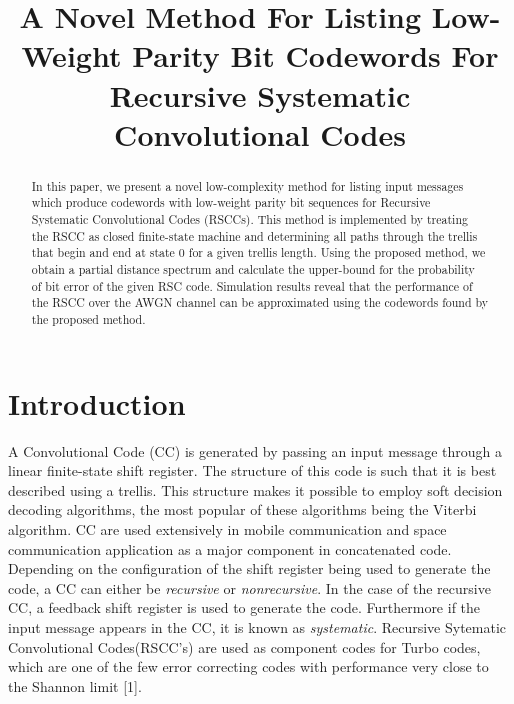 \documentclass[conference]{IEEEtran}
\begin{document}
	
	\title{A Novel Method For Listing Low-Weight Parity Bit Codewords For Recursive Systematic Convolutional Codes\\
	}
	
	\author{
		\and
	}
	
	\maketitle
	
	\begin{abstract}
In this paper, we present a novel low-complexity method for listing input messages which produce codewords with low-weight parity bit sequences for  Recursive Systematic Convolutional Codes (RSCCs).
This method is implemented by  treating the RSCC as closed finite-state machine and determining all paths through the trellis that begin and end at state 0 for a given trellis length. Using the proposed method, we obtain a partial distance spectrum and calculate the upper-bound for the probability of bit error of the given RSC code. Simulation results reveal that the performance of the RSCC over the AWGN channel can be approximated using the codewords found by the proposed method.
\end{abstract}
	
\section{Introduction}

A Convolutional Code (CC) is generated by passing an input message through a linear finite-state shift register. The structure of this code is such that it is best described using a trellis. This structure makes it possible to employ soft decision decoding algorithms, the most popular of these algorithms being the Viterbi algorithm. CC are used extensively in mobile communication and space communication application as a major component in concatenated code.  Depending on the configuration of the shift register being used to generate the code, a CC can either be \textit{recursive} or \textit{nonrecursive}. In the case of the recursive CC, a feedback shift register is used to generate the code. Furthermore if the input message appears in the CC, it is known as \textit{systematic}. Recursive Sytematic Convolutional Codes(RSCC's) are used as component codes for Turbo codes, which are one of the few error correcting codes with performance very close to the Shannon limit [1].
\end{document}
